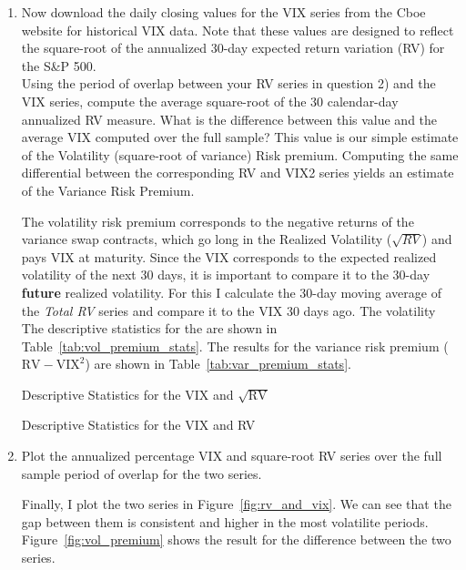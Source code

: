 \documentclass[12pt,twoside]{article}
\begin{document}
\begin{enumerate}[label = \arabic*)]
    \item Now download the daily closing values for the VIX series from the Cboe website for historical VIX data. Note that these values are designed to reflect the square-root of the annualized 30-day expected return variation (RV) for the S\&P 500. \\
    Using the period of overlap between your RV series in question 2) and the VIX series, compute the average square-root of the 30 calendar-day annualized RV measure. What is the difference between this value and the average VIX computed over the full sample? This value is our simple estimate of the Volatility (square-root of variance) Risk premium. Computing the same differential between the corresponding RV and VIX2 series yields an estimate of the Variance Risk Premium.

    \begin{solution}
        The volatility risk premium corresponds to the negative returns of the variance swap contracts, which go long in the Realized Volatility (\(\sqrt{RV}\)) and pays VIX at maturity. Since the VIX corresponds to the expected realized volatility of the next 30 days, it is important to compare it to the 30-day \textbf{future} realized volatility. For this I calculate the 30-day moving average of the \emph{Total RV} series and compare it to the VIX 30 days ago. The volatility The descriptive statistics for the are shown in Table~\ref{tab:vol_premium_stats}. The results for the variance risk premium (\(\text{RV}-\text{VIX}^2\)) are shown in Table~\ref{tab:var_premium_stats}.
        \begin{table}[!htbp]
            \centering
            \caption{Descriptive Statistics for the VIX and \(\sqrt{\text{RV}}\)}
            \label{tab:vol_premium_stats}
            \begingroup
            \color{nu purple}
            
            \endgroup
        \end{table}
        \begin{table}[!htbp]
            \centering
            \caption{Descriptive Statistics for the VIX and RV}
            \label{tab:var_premium_stats}
            \begingroup
            \color{nu purple}
            
            \endgroup
        \end{table}
    \end{solution}

    \item Plot the annualized percentage VIX and square-root RV series over the full sample period of overlap for the two series.
    \begin{solution}
        Finally, I plot the two series in Figure~\ref{fig:rv_and_vix}. We can see that the gap between them is consistent and higher in the most volatilite periods. Figure~\ref{fig:vol_premium} shows the result for the difference between the two series.


\end{solution}
\end{enumerate}
\end{document}
